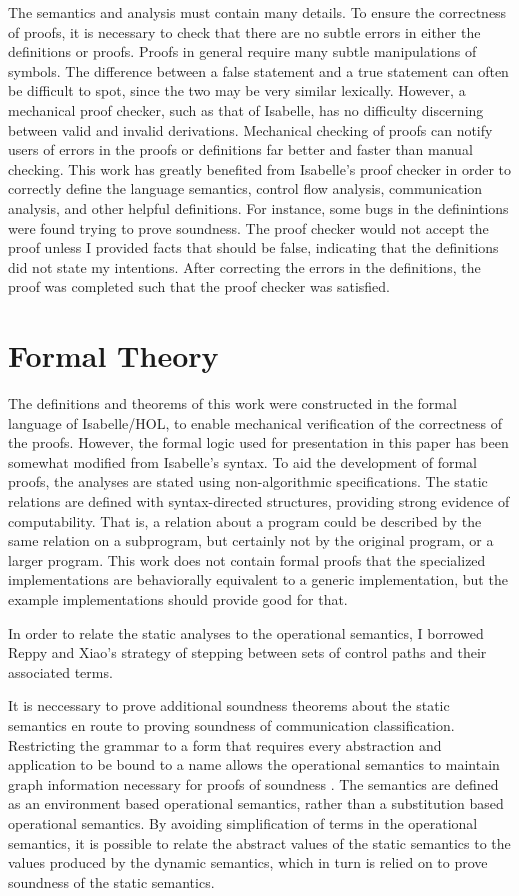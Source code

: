 \documentclass[10pt]{article}
\begin{document}
The semantics and analysis must contain many details. To ensure the
correctness of proofs, it is necessary to check that there are no subtle errors in either the 
definitions or proofs. Proofs in general require many subtle manipulations of symbols. The
difference between a false statement and a true statement can often be difficult to spot, since
the two may be very similar lexically. However, a mechanical proof checker, such as that of 
Isabelle, has no difficulty discerning between valid and invalid derivations.
Mechanical checking of proofs can notify users of errors in the proofs or definitions far better
and faster than manual checking. This work has greatly benefited from Isabelle's proof checker in
order to correctly define the language semantics, control flow analysis, communication analysis,
and other helpful definitions. For instance, some bugs in the
definintions were found trying to prove
soundness. The proof checker would not accept the proof unless I provided facts that
should be false, indicating that the definitions did not state my intentions.
After correcting the errors in the definitions, the proof was completed such that the proof
checker was satisfied.

\section{Formal Theory}

The definitions and theorems of this work were constructed in the formal
language of Isabelle/HOL,
to enable mechanical verification of the correctness of the proofs.
However, the formal logic used
for presentation in this paper has been somewhat modified from Isabelle's syntax. 
To aid the development of formal proofs,
the analyses are stated using non-algorithmic specifications.
The static relations are defined
with syntax-directed structures, providing strong evidence of computability.
That is, a relation about a program could be described by the same relation on a subprogram,
but certainly not by the original program, or a larger program.
This work does not contain formal proofs that  the specialized implementations are
behaviorally equivalent to a generic implementation, but the example implementations
should provide good for that.

In order to relate the static analyses to the operational semantics, I
borrowed Reppy and Xiao's strategy of stepping between sets of control paths and
their associated terms.

It is neccessary to prove additional soundness theorems about the static semantics en route to
proving soundness of communication classification. Restricting the grammar to a form that
requires
every abstraction and application to be bound to a name allows the operational
semantics to maintain graph information necessary for proofs of soundness \cite{}.
The semantics are defined as an environment based operational semantics, rather than a
substitution based operational semantics. By avoiding simplification of terms in the
operational semantics, it is possible to relate
the abstract values of the static semantics to the
values produced by the dynamic semantics, which in turn is relied on to prove 
soundness of the static semantics.
\end{document}
